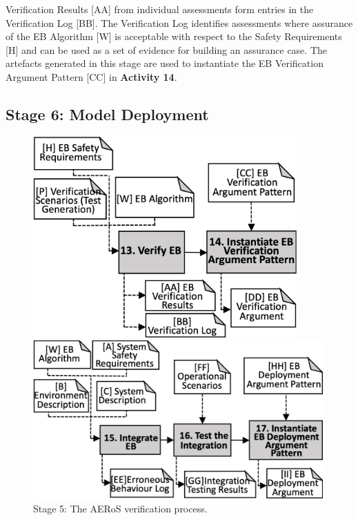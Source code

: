 \documentclass[runningheads]{llncs}
\begin{document}
Verification Results [AA] from individual assessments form entries in the Verification Log [BB]. The Verification Log identifies assessments where assurance of the EB Algorithm [W] is acceptable with respect to the Safety Requirements [H] and can be used as a set of evidence for building an assurance case. %
The artefacts generated in this stage are used to instantiate the EB Verification Argument Pattern [CC] in \textbf{Activity 14}.

\subsection{Stage 6: Model Deployment} \label{framework-stage6}
\begin{figure}[!t]
	\centering
	\begin{minipage}[b]{.47\textwidth}
			\centering
			\includegraphics[width=0.9\textwidth]{figures/AERoS-Stage5-v2.png}%
			\vspace{-2ex}
			\caption{Stage 5: The AERoS verification process.}
			\label{amlas-a-stage5}
	      \end{minipage}%
      \hspace*{0.01\textwidth}
	\begin{minipage}[b]{.5\textwidth}
			\centering
			\includegraphics[width=0.99\textwidth]{figures/AERoS-Stage6-v2.png}%

\end{minipage}
\end{figure}
\end{document}
